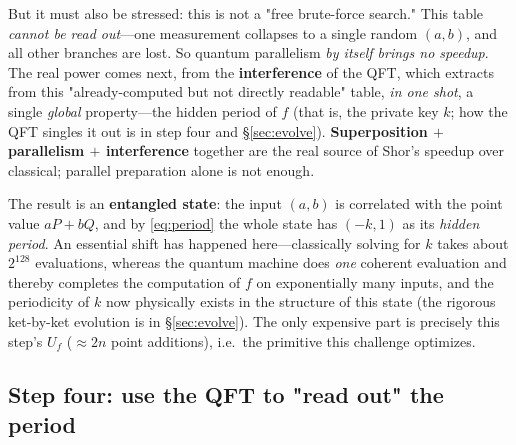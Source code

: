 \documentclass[11pt]{article}
\newcommand{\secref}[1]{\hyperref[#1]{\S\ref*{#1}}}
\begin{document}
But it must also be stressed: this is not a "free brute-force search." This table \emph{cannot be read out}---one measurement collapses to a single random $(a,b)$, and all other branches are lost.
So quantum parallelism \emph{by itself brings no speedup}. The real power comes next, from the \textbf{interference} of the QFT, which extracts from this "already-computed but not directly readable" table, \emph{in one shot},
a single \emph{global} property---the hidden period of $f$ (that is, the private key $k$; how the QFT singles it out is in step four and \secref{sec:evolve}). \textbf{Superposition $+$ parallelism $+$ interference}
together are the real source of Shor's speedup over classical; parallel preparation alone is not enough.

The result is an \textbf{entangled state}: the input $(a,b)$ is correlated with the point value $aP+bQ$, and by \eqref{eq:period} the whole state has $(-k,1)$ as its
\emph{hidden period}. An essential shift has happened here---classically solving for $k$ takes about $2^{128}$ evaluations, whereas the quantum machine does \emph{one} coherent evaluation and thereby completes the computation of $f$
on exponentially many inputs, and the periodicity of $k$ now physically exists in the structure of this state (the rigorous ket-by-ket evolution is in \secref{sec:evolve}).
The only expensive part is precisely this step's $U_f$ ($\approx2n$ point additions), i.e.\ the primitive this challenge optimizes.

\subsection{Step four: use the QFT to "read out" the period}
\end{document}
